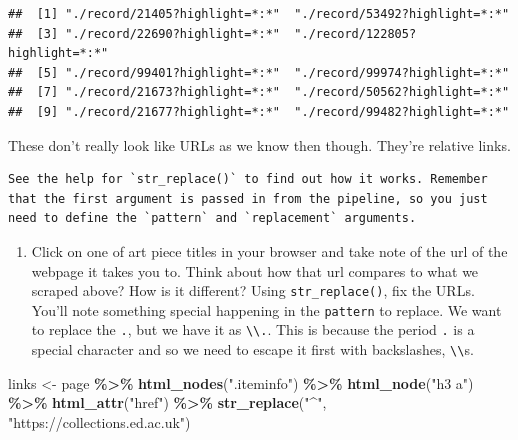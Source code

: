 \documentclass[
]{article}
\newenvironment{Shaded}{\begin{snugshade}}{\end{snugshade}}
\newcommand{\FunctionTok}[1]{\textcolor[rgb]{0.13,0.29,0.53}{\textbf{#1}}}
\newcommand{\NormalTok}[1]{#1}
\newcommand{\OtherTok}[1]{\textcolor[rgb]{0.56,0.35,0.01}{#1}}
\newcommand{\SpecialCharTok}[1]{\textcolor[rgb]{0.81,0.36,0.00}{\textbf{#1}}}
\newcommand{\StringTok}[1]{\textcolor[rgb]{0.31,0.60,0.02}{#1}}
\providecommand{\tightlist}{%
  \setlength{\itemsep}{0pt}\setlength{\parskip}{0pt}}
\begin{document}
\begin{verbatim}
##  [1] "./record/21405?highlight=*:*"  "./record/53492?highlight=*:*" 
##  [3] "./record/22690?highlight=*:*"  "./record/122805?highlight=*:*"
##  [5] "./record/99401?highlight=*:*"  "./record/99974?highlight=*:*" 
##  [7] "./record/21673?highlight=*:*"  "./record/50562?highlight=*:*" 
##  [9] "./record/21677?highlight=*:*"  "./record/99482?highlight=*:*"
\end{verbatim}

These don't really look like URLs as we know then though. They're
relative links.

\begin{verbatim}
See the help for `str_replace()` to find out how it works. Remember that the first argument is passed in from the pipeline, so you just need to define the `pattern` and `replacement` arguments.
\end{verbatim}

\begin{enumerate}
\def\labelenumi{\arabic{enumi}.}
\tightlist
\item
  Click on one of art piece titles in your browser and take note of the
  url of the webpage it takes you to. Think about how that url compares
  to what we scraped above? How is it different? Using
  \texttt{str\_replace()}, fix the URLs. You'll note something special
  happening in the \texttt{pattern} to replace. We want to replace the
  \texttt{.}, but we have it as
  \texttt{\textbackslash{}\textbackslash{}.}. This is because the period
  \texttt{.} is a special character and so we need to escape it first
  with backslashes, \texttt{\textbackslash{}\textbackslash{}}s.
\end{enumerate}

\begin{Shaded}
\begin{Highlighting}[]
\NormalTok{links }\OtherTok{\textless{}{-}}\NormalTok{ page }\SpecialCharTok{\%\textgreater{}\%}
  \FunctionTok{html\_nodes}\NormalTok{(}\StringTok{".iteminfo"}\NormalTok{) }\SpecialCharTok{\%\textgreater{}\%}
  \FunctionTok{html\_node}\NormalTok{(}\StringTok{"h3 a"}\NormalTok{) }\SpecialCharTok{\%\textgreater{}\%}
  \FunctionTok{html\_attr}\NormalTok{(}\StringTok{"href"}\NormalTok{) }\SpecialCharTok{\%\textgreater{}\%}
  \FunctionTok{str\_replace}\NormalTok{(}\StringTok{"\^{}"}\NormalTok{, }\StringTok{"https://collections.ed.ac.uk"}\NormalTok{)}
\end{Highlighting}
\end{Shaded}
\end{document}
